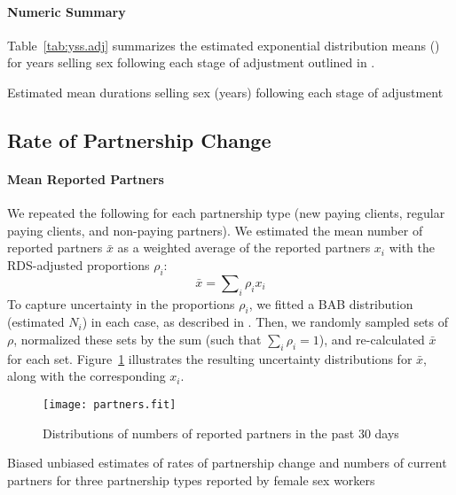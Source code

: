 \paragraph{Numeric Summary}
Table~\ref{tab:yss.adj} summarizes the estimated exponential distribution means (\ci)
for years selling sex following each stage of adjustment outlined in .
\begin{table}[h]
  \centering
  \caption{Estimated mean durations selling sex (years) following each stage of adjustment}
  
  \label{tab:yss.adj}
\end{table}
\subsection{Rate of Partnership Change}\label{app.partners}
\paragraph{Mean Reported Partners}
We repeated the following for each partnership type
(new paying clients, regular paying clients, and non-paying partners).
We estimated the mean number of reported partners $\bar{x}$ as a weighted average
of the reported partners $x_i$ with the RDS-adjusted proportions $\rho_i$:
\begin{equation}\label{eq:x.bar}
  \bar{x} = \sum\nolimits_i \rho_i x_i
\end{equation}
To capture uncertainty in the proportions $\rho_i$,
we fitted a BAB distribution (\ie estimated $N_i$) in each case, as described in .
Then, we randomly sampled sets of $\rho$,
normalized these sets by the sum (such that $\sum_i \rho_i = 1$), and
re-calculated $\bar{x}$ for each set.
Figure~\ref{fig:partners.fit} illustrates
the resulting uncertainty distributions for $\bar{x}$,
along with the corresponding $x_i$.
\begin{figure}[h]
  \texttt{[image: partners.fit]}
  \caption{Distributions of numbers of reported partners in the past 30 days}
  \label{fig:partners.fit}
\end{figure}
\begin{table}[h]
  \centering
  \caption{Biased \vs unbiased estimates of
    rates of partnership change and numbers of current partners
    for three partnership types reported by female sex workers}
  
  \label{tab:partners.fsw}
\end{table}
